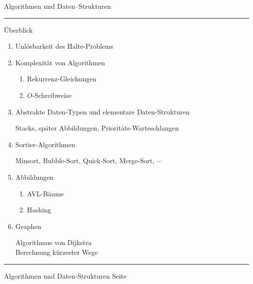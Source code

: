\documentclass{slides}
\newcounter{mypage}
\begin{document}
\begin{center}
Algorithmen und Daten--Strukturen
\end{center}


\rule{17cm}{1mm}

\footnotesize
Überblick 
\begin{enumerate}
\item Unl\"osbarkeit des Halte-Problems
\item Komplexit\"at von Algorithmen
      \begin{enumerate}
      \item Rekurrenz-Gleichungen
      \item $O$-Schreibweise
      \end{enumerate}
\item Abstrakte Daten-Typen und elementare Daten-Strukturen
  
      Stacks, sp\"ater Abbildungen, Priorit\"ats-Warteschlangen
\item Sortier-Algorithmen

      Minsort, Bubble-Sort, Quick-Sort, Merge-Sort, $\cdots$
\item Abbildungen
  \begin{enumerate}
  \item AVL-B\"aume
  \item Hashing
  \end{enumerate}
\item Graphen 

      Algorithmus von Dijkstra \\
      Berechnung k\"urzester Wege
\end{enumerate}

\begin{center}
\end{center}

\vspace*{0.2cm}

\scriptsize

\vspace*{\fill}
\tiny \addtocounter{mypage}{1}
\rule{17cm}{1mm}
Algorithmen und Daten-Strukturen  \hspace*{\fill} Seite 

\end{document}
